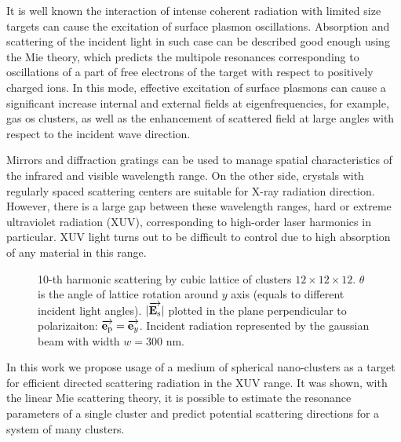 It is well known the interaction of intense coherent radiation with limited size targets can cause the excitation of surface plasmon oscillations. Absorption and scattering of the incident light in such case can be described good enough using the Mie theory, which predicts the multipole resonances corresponding to oscillations of a part of free electrons of the target with respect to positively charged ions. In this mode, effective excitation of surface plasmons can cause a significant increase
internal and external fields at eigenfrequencies, for example, gas os clusters, as well as the enhancement of scattered field at large angles with respect to the incident wave direction.

Mirrors and diffraction gratings can be used to manage spatial characteristics of the infrared and visible wavelength range. On the other side, crystals with regularly spaced scattering centers are suitable for X-ray radiation direction. However, there is a large gap between these wavelength ranges, hard or extreme ultraviolet radiation (XUV), corresponding to high-order laser harmonics in particular. XUV light turns out to be difficult to control due to high absorption of any material in this range.

\begin{figure}[H]
    \hfil
    \caption{10-th harmonic scattering by cubic lattice of clusters $12\times12\times12$. $\theta$ is the angle of lattice rotation around $y$ axis (equals to different incident light angles). $|\overrightarrow{\textbf{E}_{\textrm{s}}}|$ plotted in the plane perpendicular to polarizaiton: $\overrightarrow{\textbf{e}_{\textrm{p}}} = \overrightarrow{\textbf{e}_{y}}$. Incident radiation represented by the gaussian beam with width $w = 300$ nm.}
    \label{fig:image}
\end{figure}

In this work we propose usage of a medium of spherical nano-clusters as a target for efficient directed scattering radiation in the XUV range. It was shown, with the linear Mie scattering theory, it is possible to estimate the resonance parameters of a single cluster and predict potential scattering directions for a system of many clusters.

